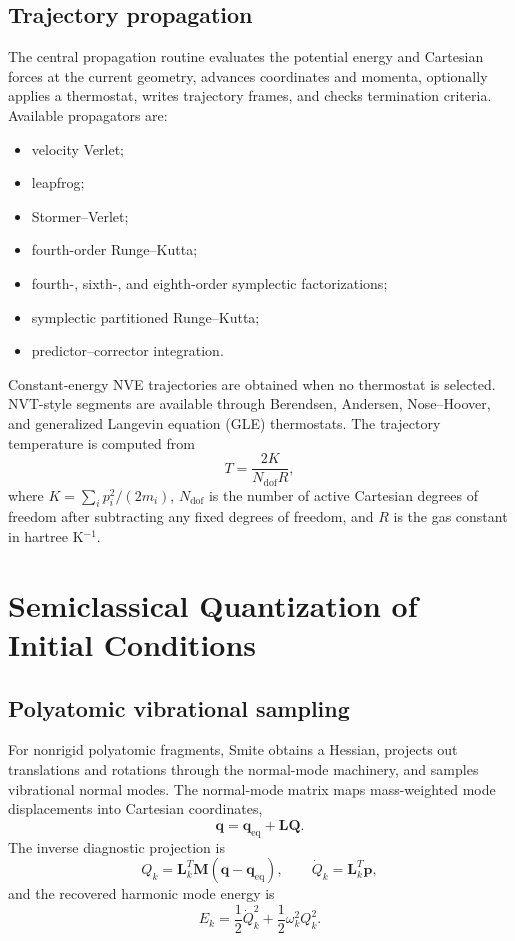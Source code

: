 \documentclass[11pt]{article}
\begin{document}
\subsection{Trajectory propagation}

The central propagation routine evaluates the potential energy and Cartesian forces at the current geometry, advances coordinates and momenta, optionally applies a thermostat, writes trajectory frames, and checks termination criteria.  Available propagators are:
\begin{itemize}
  \item velocity Verlet;
  \item leapfrog;
  \item Stormer--Verlet;
  \item fourth-order Runge--Kutta;
  \item fourth-, sixth-, and eighth-order symplectic factorizations;
  \item symplectic partitioned Runge--Kutta;
  \item predictor--corrector integration.
\end{itemize}

Constant-energy NVE trajectories are obtained when no thermostat is selected.  NVT-style segments are available through Berendsen, Andersen, Nose--Hoover, and generalized Langevin equation (GLE) thermostats.  The trajectory temperature is computed from
\begin{equation}
  T = \frac{2K}{N_{\mathrm{dof}} R},
\end{equation}
where $K=\sum_i p_i^2/(2m_i)$, $N_{\mathrm{dof}}$ is the number of active Cartesian degrees of freedom after subtracting any fixed degrees of freedom, and $R$ is the gas constant in hartree K$^{-1}$.

\section{Semiclassical Quantization of Initial Conditions}

\subsection{Polyatomic vibrational sampling}

For nonrigid polyatomic fragments, Smite obtains a Hessian, projects out translations and rotations through the normal-mode machinery, and samples vibrational normal modes.  The normal-mode matrix maps mass-weighted mode displacements into Cartesian coordinates,
\begin{equation}
  \mathbf{q} = \mathbf{q}_{\mathrm{eq}} + \mathbf{L}\mathbf{Q}.
\end{equation}
The inverse diagnostic projection is
\begin{equation}
  Q_k = \mathbf{L}_k^T \mathbf{M}(\mathbf{q}-\mathbf{q}_{\mathrm{eq}}),
  \qquad
  \dot{Q}_k = \mathbf{L}_k^T \mathbf{p},
\end{equation}
and the recovered harmonic mode energy is
\begin{equation}
  E_k = \frac{1}{2}\dot{Q}_k^2 + \frac{1}{2}\omega_k^2 Q_k^2.
\end{equation}
\end{document}
